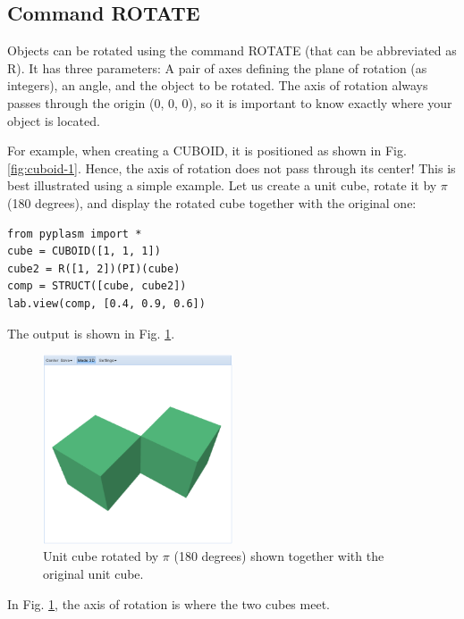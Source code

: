 \documentclass[article,A4,12pt]{llncs}
\begin{document}
\subsection{Command ROTATE}

Objects can be rotated using the command ROTATE (that
can be abbreviated as R). It has three parameters:
A pair of axes defining the plane of rotation (as integers),
an angle, and the object to be rotated. The axis of rotation 
always passes through the origin (0, 0, 0), so it is important 
to know exactly where your object is located. 

For example, when creating 
a CUBOID, it is positioned as shown in Fig. \ref{fig:cuboid-1}.
Hence, the axis of rotation does not pass through its center!
This is best illustrated using a simple example. Let us create 
a unit cube, rotate it by $\pi$ (180 degrees), and display 
the rotated cube together with the original one:

\begin{verbatim}
from pyplasm import *
cube = CUBOID([1, 1, 1])
cube2 = R([1, 2])(PI)(cube)
comp = STRUCT([cube, cube2])
lab.view(comp, [0.4, 0.9, 0.6])
\end{verbatim}
The output is shown in Fig. \ref{fig:rot-1}.

\newpage

\begin{figure}[!ht]
\begin{center}
\includegraphics[width=0.5\textwidth]{img/rot-1.png}
\end{center}
\vspace{-2mm}
\caption{Unit cube rotated by $\pi$ (180 degrees) shown together with the original unit cube.}
\label{fig:rot-1}
\end{figure}
\noindent
In Fig. \ref{fig:rot-1}, the axis of rotation is where the two cubes meet. 
\end{document}
